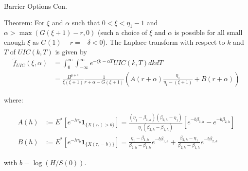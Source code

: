\documentclass{beamer}
\begin{document}
\begin{frame}{Barrier Options Con.}

    {\footnotesize \footnotesize
    \par Theorem:  For \(\xi\) and \(\alpha\) such that \(0 < \xi < \eta_1 - 1\) and \(\alpha > \max(G(\xi + 1) - r, 0)\) (such a choice of \(\xi\) and \(\alpha\) is possible 
    for all small enough \(\xi\) as \(G(1) - r = -\delta < 0\)). The Laplace transform with respect to \(k\) and \(T\) of \(UIC(k, T)\) is given by
    \begin{align*}
    \tilde{f}_{UIC}(\xi, \alpha) &= \int_{0}^{\infty} \int_{-\infty}^{\infty} e^{-\xi k - \alpha T} UIC(k, T) dk dT \\
    &= \frac{H^{\xi+1}}{\xi (\xi + 1)} \frac{1}{r + \alpha - G(\xi + 1)} \left( A(r + \alpha) \frac{\eta_1}{\eta_1 - (\xi + 1)} + B(r + \alpha) \right)
    \end{align*}
    \par  \pause where:

    \begin{align*}
    A(h) &:= E^* \left[ e^{-h\tau_b} \mathbf{1}_{\{X(\tau_b) > b\}} \right] =
     \frac{(\eta_1 - \beta_{1,h}) (\beta_{2,h} - \eta_1)}{\eta_1 (\beta_{2,h} - \beta_{1,h})} \left[ e^{-b\beta_{1,h}} - e^{-b\beta_{2,h}} \right]\\
    B(h) &:= E^* \left[ e^{-h\tau_b} \mathbf{1}_{\{X(\tau_b = b)\}} \right] =
    \frac{\eta_1 - \beta_{1,h}}{\beta_{2,h} - \beta_{1,h}} e^{-b\beta_{1,h}} + \frac{\beta_{2,h} - \eta_1}{\beta_{2,h} - \beta_{1,h}} e^{-b\beta_{2,h}}
    \end{align*}
    \par with \(b = \log(H/S(0))\).
    }
    


\end{frame}
\end{document}
